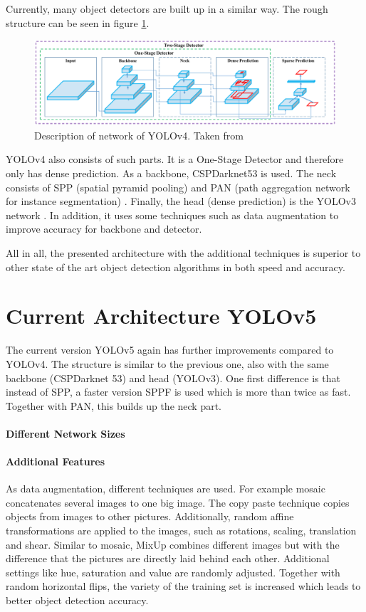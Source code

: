 Currently, many object detectors are built up in a similar way. The rough structure can be seen in figure \ref{fig:yolov4_architecture}.

\begin{figure}[htb!]
	\centering
	\includegraphics[scale=0.31]{figures/yolov4_architecture.png}
	\caption{Description of network of YOLOv4. Taken from \cite{yolov4}}
	\label{fig:yolov4_architecture}
\end{figure}

YOLOv4 \cite{yolov4} also consists of such parts. It is a One-Stage Detector and therefore only has dense prediction. As a backbone, CSPDarknet53 \cite{Wang_2020_CVPR_Workshops} is used. The neck consists of SPP (spatial pyramid pooling) \cite{7005506} and PAN (path aggregation network for instance segmentation) \cite{Liu_2018_CVPR}. Finally, the head (dense prediction) is the YOLOv3 network \cite{yolov3}. In addition, it uses some techniques such as data augmentation to improve accuracy for backbone and detector. 

All in all, the presented architecture with the additional techniques is superior to other state of the art object detection algorithms in both speed and accuracy. 

\section{Current Architecture YOLOv5} 

The current version YOLOv5 \cite{yolov5} again has further improvements compared to YOLOv4. The structure is similar to the previous one, also with the same backbone (CSPDarknet 53) and head (YOLOv3). One first difference is that instead of SPP, a faster version SPPF is used which is more than twice as fast. Together with PAN, this builds up the neck part.

\paragraph{Different Network Sizes}

\paragraph{Additional Features}
As data augmentation, different techniques are used. For example mosaic concatenates several images to one big image. The copy paste technique copies objects from images to other pictures.  Additionally, random affine transformations are applied to the images, such as rotations, scaling, translation and shear. Similar to mosaic, MixUp combines different images but with the difference that the pictures are directly laid behind each other. Additional settings like hue, saturation and value are randomly adjusted. Together with random horizontal flips, the variety of the training set is increased which leads to better object detection accuracy.
